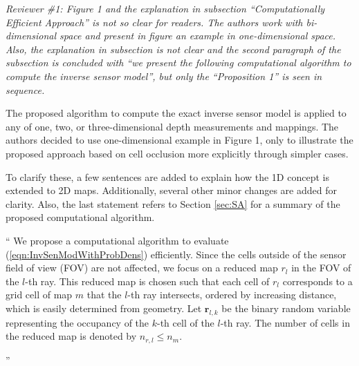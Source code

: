 \documentclass[11pt]{article}
\newcommand{\refeqn}[1]{(\ref{eqn:#1})}
\newenvironment{correction}{\begin{list}{}{\setlength{\leftmargin}{1cm}\setlength{\rightmargin}{1cm}}\vspace{\parsep}\item[]``}{''\end{list}}
\begin{document}
\begin{enumerate}
\item {\itshape Reviewer \#1: Figure 1 and the explanation in subsection ``Computationally Efficient Approach'' is not so clear for readers. The authors work with bi-dimensional space and present in figure an example in one-dimensional space. Also, the explanation in subsection is not clear and the second paragraph of the subsection is concluded with ``we present the following computational algorithm to compute the inverse sensor model'', but only the ``Proposition 1'' is seen in sequence.}

The proposed algorithm to compute the exact inverse sensor model is applied to any of one, two, or three-dimensional depth measurements and mappings. The authors decided to use one-dimensional example in Figure 1, only to illustrate the proposed approach based on cell occlusion more explicitly through simpler cases. 

To clarify these, a few sentences are added to explain how the 1D concept is extended to 2D maps. Additionally, several other minor changes are added for clarity. Also, the last statement refers to Section \ref{sec:SA} for a summary of the proposed computational algorithm. 

\begin{correction}
%
We propose a computational algorithm to evaluate \refeqn{InvSenModWithProbDens} efficiently. 
Since the cells outside of the sensor field of view (FOV) are not affected, we focus on a reduced map $r_l$ in the FOV of the $l$-th ray. This reduced map is chosen such that each cell of $r_l$ corresponds to a grid cell of map $m$ that the $l$-th ray intersects, ordered by increasing distance, which is easily determined from geometry. Let $\mathbf{r}_{l,k}$ be the binary random variable representing the occupancy of the $k$-th cell of the $l$-th ray. The number of cells in the reduced map is denoted by $n_{r,l}\leq n_m$.


\end{correction}
\end{enumerate}
\end{document}
